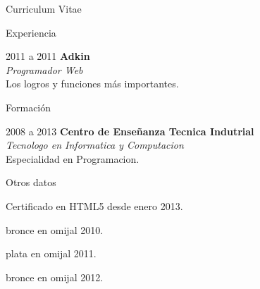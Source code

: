 \documentclass[letterpaper,12pt]{article}
\begin{document}
\begin{cv}{Curriculum Vitae}
\begin{cvlist}{Experiencia}
         \item[2011 a 2011] \textbf{Adkin}\\
                \emph{Programador Web}\\
                Los logros y funciones más importantes.

\end{cvlist}

\begin{cvlist}{Formación}

        \item[2008 a 2013] \textbf{Centro de Enseñanza Tecnica Indutrial}\\
                \emph{Tecnologo en Informatica y Computacion}\\
                Especialidad en Programacion.


\end{cvlist}

\begin{cvlist}{Otros datos}
        \item Certificado en HTML5 desde enero 2013.
        \item bronce en omijal 2010.
        \item plata en omijal 2011.
        \item bronce en omijal 2012.
\end{cvlist}

\end{cv}
\end{document}
